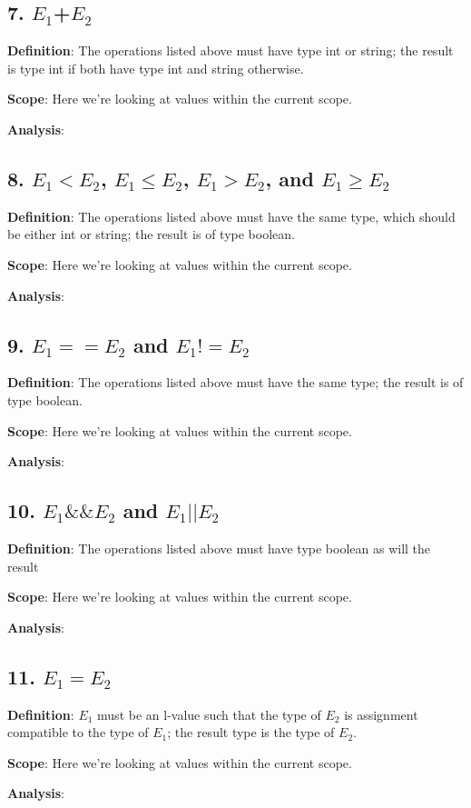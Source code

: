 \documentclass[11pt, oneside]{article}
\begin{document}
\subsection*{7. $E_1$+$E_2$}
\par \textbf{Definition}: The operations listed above must have type int or string; the result is type int if both have type int and string otherwise.
\par \textbf{Scope}: Here we're looking at values within the current scope.
\par \textbf{Analysis}: 

\subsection*{8. $E_1 < E_2$, $E_1 \leq E_2$, $E_1 > E_2$, and $E_1 \geq E_2$}
\par \textbf{Definition}: The operations listed above must have the same type, which should be either int or string; the result is of type boolean.
\par \textbf{Scope}: Here we're looking at values within the current scope.
\par \textbf{Analysis}: 

\subsection*{9. $E_1==E_2$ and $E_1!=E_2$}
\par \textbf{Definition}: The operations listed above must have the same type; the result is of type boolean.
\par \textbf{Scope}: Here we're looking at values within the current scope.
\par \textbf{Analysis}: 

\subsection*{10. $E_1\&\&E_2$ and $E_1||E_2$}
\par \textbf{Definition}: The operations listed above must have type boolean as will the result
\par \textbf{Scope}: Here we're looking at values within the current scope.
\par \textbf{Analysis}:

\subsection*{11. $E_1=E_2$}
\par \textbf{Definition}: $E_1$ must be an l-value such that the type of $E_2$ is assignment compatible
to the type of $E_1$; the result type is the type of $E_2$.
\par \textbf{Scope}: Here we're looking at values within the current scope.
\par \textbf{Analysis}: 
\end{document}
